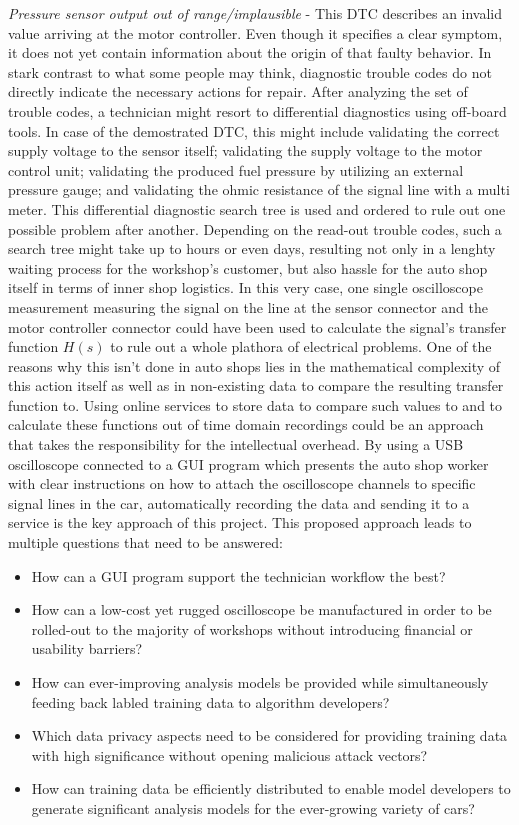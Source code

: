\documentclass[conference,a4paper]{IEEEtran}
\begin{document}
\textit{Pressure sensor output out of range/implausible} - This DTC describes an invalid value arriving at the motor controller.
Even though it specifies a clear symptom, it does not yet contain information about the origin of that faulty behavior.
In stark contrast to what some people may think, diagnostic trouble codes do not directly indicate the necessary actions for repair.
After analyzing the set of trouble codes, a technician might resort to differential diagnostics using off-board tools.
In case of the demostrated DTC, this might include validating the correct supply voltage to the sensor itself; 
validating the supply voltage to the motor control unit; validating the produced fuel pressure by utilizing an external pressure gauge; and validating the ohmic resistance of the signal line with a multi meter.
This differential diagnostic search tree is used and ordered to rule out one possible problem after another.
Depending on the read-out trouble codes, such a search tree might take up to hours or even days, resulting not only in a lenghty waiting process for the workshop's customer, but also hassle for the auto shop itself in terms of inner shop logistics.
In this very case, one single oscilloscope measurement measuring the signal on the line at the sensor connector and the motor controller connector could have been used to calculate the signal's transfer function $H(s)$ to rule out a whole plathora of electrical problems.
One of the reasons why this isn't done in auto shops lies in the mathematical complexity of this action itself as well as in non-existing data to compare the resulting transfer function to.
Using online services to store data to compare such values to and to calculate these functions out of time domain recordings could be an approach that takes the responsibility for the intellectual overhead.
By using a USB oscilloscope connected to a GUI program which presents the auto shop worker with clear instructions on how to attach the oscilloscope channels to specific signal lines in the car, automatically recording the data and sending it to a service is the key approach of this project. 
This proposed approach leads to multiple questions that need to be answered:
\begin{itemize}
  \item How can a GUI program support the technician workflow the best?
  \item How can a low-cost yet rugged oscilloscope be manufactured in order to be rolled-out to the majority of workshops without introducing financial or usability barriers?
  \item How can ever-improving analysis models be provided while simultaneously feeding back labled training data to algorithm developers?
  \item Which data privacy aspects need to be considered for providing training data with high significance without opening malicious attack vectors?
  \item How can training data be efficiently distributed to enable model developers to generate significant analysis models for the ever-growing variety of cars?
\end{itemize}
\end{document}
